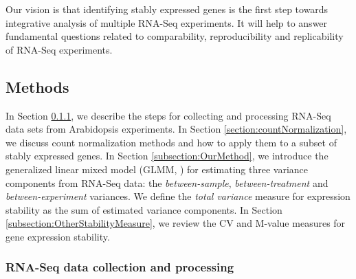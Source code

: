 Our vision is that identifying stably expressed genes is the first step
towards integrative analysis of multiple RNA-Seq experiments. It will help to
answer fundamental questions related to  comparability, reproducibility and
replicability of RNA-Seq experiments.

\subsection{Methods} 
\label{section:Methods}
In Section \ref{section:DataCollection}, we describe the steps for collecting
and processing RNA-Seq data sets from Arabidopsis experiments.  In Section
\ref{section:countNormalization}, we discuss count normalization methods and
how to apply them to a subset of stably expressed genes.
In Section \ref{subsection:OurMethod},  we introduce the generalized linear
mixed model (GLMM, \citet{mcculloch2001generalized}) for estimating three
variance components from RNA-Seq data: the \textit{between-sample},
\textit{between-treatment} and \textit{between-experiment} variances.  We
define the \textit{total variance} measure for expression stability as the sum
of estimated variance components.  In Section
\ref{subsection:OtherStabilityMeasure}, we review the CV and M-value measures
for gene expression stability.



\subsubsection{RNA-Seq data collection and processing}\label{section:DataCollection} 

